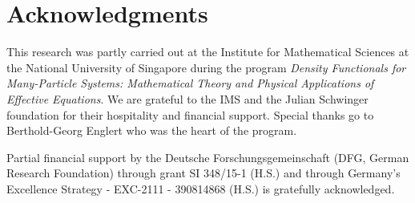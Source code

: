 \documentclass[AHL,Unicode,longabstracts,published]{cedram}
\begin{document}
\section*{Acknowledgments}

This research was partly carried out at the Institute for Mathematical Sciences at the National University of Singapore during the program
\emph{Density Functionals for Many-Particle Systems: Mathematical Theory and Physical Applications of Effective Equations}. We are grateful to the IMS and the Julian Schwinger foundation for their hospitality and financial support. Special thanks go to Berthold-Georg Englert who was the heart of the program.


Partial financial support by the Deutsche Forschungsgemeinschaft (DFG, German Research Foundation) through grant SI 348/15-1 (H.S.) and through Germany's Excellence Strategy - EXC-2111 - 390814868 (H.S.) is gratefully acknowledged.




\end{document}
